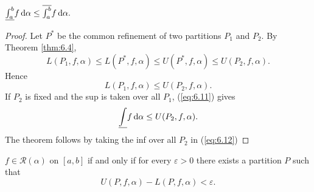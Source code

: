 \begin{thm}
    \label{thm:6.5}
    $\underline{\int_{a}^{b}} f \d \alpha \leq
    \overline{\int_{a}^{b}} f \d \alpha .$
\end{thm}
\begin{proof}
    Let $P^*$ be the common refinement of two partitions $P_1$ and $P_2$.
    By Theorem \ref{thm:6.4},
    \begin{equation*}
        L(P_1, f, \alpha) \leq
        L(P^*, f, \alpha) \leq
        U(P^*, f, \alpha) \leq
        U(P_2, f, \alpha) .
    \end{equation*}
    Hence 
    \begin{equation}
        \label{eq:6.11}
        L(P_1, f, \alpha) \leq
        U(P_2, f, \alpha) .
    \end{equation}
    If $P_2$ is fixed and the sup is taken over all $P_1$,
    (\ref{eq:6.11}) gives
    \begin{equation}
        \label{eq:6.12}
        \underline{\int} f \d \alpha \leq
        U(P_2, f, \alpha) .
    \end{equation}
    The theorem follows by taking the inf over all $P_2$ in (\ref{eq:6.12})
\end{proof}

\begin{thm}
    \label{thm:6.6}
    $f \in \mathscr{R} (\alpha)$ on $[a, b]$ if and only if 
    for every $\varepsilon > 0$ there exists a partition $P$
    such that
    \begin{equation}
        \label{eq:6.13}
        U(P, f, \alpha) -
        L(P, f, \alpha) < \varepsilon.
    \end{equation}
\end{thm}

